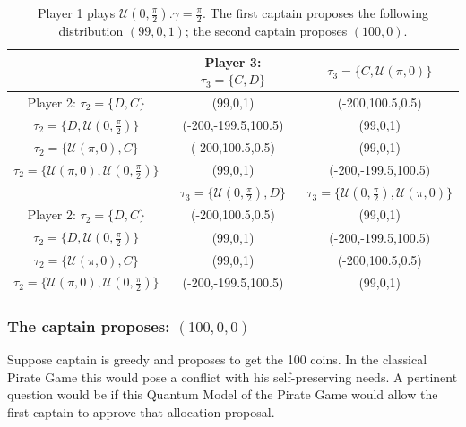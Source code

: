 \documentclass[10pt,twocolumn]{llncs}
\begin{document}
\begin{center}
\begin{table}[h!]
\begin{centering}
\begin{tabular}{ccc}
\hline 
 & Player 3: $\tau_{3}=\{C,D\}$ &  $\tau_{3}=\{C,\mathcal{U}(\pi,0)\}$\tabularnewline
\hline 
Player 2: $\tau_{2}=\{D,C\}$ & (99,0,1) & (-200,100.5,0.5)\tabularnewline
$\tau_{2}=\{D,\mathcal{U}(0,\frac{\pi}{2})\}$ & (-200,-199.5,100.5) & (99,0,1)\tabularnewline
$\tau_{2}=\{\mathcal{U}(\pi,0),C\}$ & (-200,100.5,0.5) & (99,0,1)\tabularnewline
$\tau_{2}=\{\mathcal{U}(\pi,0),\mathcal{U}(0,\frac{\pi}{2})\}$ & (99,0,1) & (-200,-199.5,100.5)\tabularnewline
\hline 
\hline 
 & $\tau_{3}=\{\mathcal{U}(0,\frac{\pi}{2}),D\}$ & $\tau_{3}=\{\mathcal{U}(0,\frac{\pi}{2}),\mathcal{U}(\pi,0)\}$\tabularnewline
Player 2: $\tau_{2}=\{D,C\}$ & (-200,100.5,0.5) & (99,0,1)\tabularnewline
$\tau_{2}=\{D,\mathcal{U}(0,\frac{\pi}{2})\}$ & (99,0,1) & (-200,-199.5,100.5)\tabularnewline
$\tau_{2}=\{\mathcal{U}(\pi,0),C\}$ & (99,0,1) & (-200,100.5,0.5)\tabularnewline
$\tau_{2}=\{\mathcal{U}(\pi,0),\mathcal{U}(0,\frac{\pi}{2})\}$ & (-200,-199.5,100.5) & (99,0,1)\tabularnewline
\end{tabular}
\par\end{centering}

\caption{Player 1 plays $\mathcal{U}(0,\frac{\pi}{2})$.$\gamma=\frac{\pi}{2}$. The first captain proposes the following distribution $(99,0,1)$; the second captain proposes $(100,0)$. }
\label{livingontheedge}
\end{table}

\par\end{center}



\subsubsection{The captain proposes: $(100, 0, 0)$}
\label{subsubsec:3playergame100}

Suppose captain is greedy and proposes to get the 100 coins. In the classical Pirate Game this would pose a conflict with his self-preserving needs. 
A pertinent question would be if this Quantum Model of the Pirate Game would allow the first captain to approve that allocation proposal. 
\end{document}
